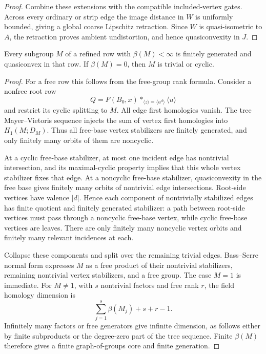 \begin{proof}
Combine these extensions with the compatible included-vertex
gates. Across every ordinary or strip edge the image distance
in \(W\) is uniformly bounded, giving a global coarse Lipschitz
retraction. Since \(W\) is quasi-isometric to \(A\), the retraction
proves ambient undistortion, and hence quasiconvexity in \(J\).
\end{proof}

\begin{lemma}\label{row:row-finiteness}
Every subgroup \(M\) of a refined row with \(\beta(M)<\infty\) is
finitely generated and quasiconvex in that row. If \(\beta(M)=0\),
then \(M\) is trivial or cyclic.
\end{lemma}

\begin{proof}
For a free row this follows from the free-group rank formula.
Consider a nonfree root row
\[
 Q=F(B_0,x)*_{\langle z\rangle=\langle u^d\rangle}\langle u\rangle
\]
and restrict its cyclic splitting to \(M\).
All edge first homologies vanish. The tree Mayer--Vietoris sequence
injects the sum of vertex first homologies into \(H_1(M;D_M)\).
Thus all free-base vertex stabilizers are finitely generated, and
only finitely many orbits of them are noncyclic.

At a cyclic free-base stabilizer, at most one incident edge has
nontrivial intersection, and its maximal-cyclic property implies
that this whole vertex stabilizer fixes that edge. At a noncyclic
free-base stabilizer, quasiconvexity in the free base gives finitely
many orbits of nontrivial edge intersections. Root-side vertices
have valence \(|d|\).
Hence each component of nontrivially stabilized edges has finite
quotient and finitely generated stabilizer: a path between root-side
vertices must pass through a noncyclic free-base vertex, while
cyclic free-base vertices are leaves. There are only finitely many
noncyclic vertex orbits and finitely many relevant incidences at each.

Collapse these components and split over the remaining trivial
edges. Bass--Serre normal form expresses \(M\) as a free product of
their nontrivial stabilizers, remaining nontrivial vertex stabilizers,
and a free group. The case \(M=1\) is immediate. For \(M\neq1\),
with \(s\) nontrivial factors and free rank \(r\), the field homology
dimension is
\[
 \sum_{j=1}^{s}\beta(M_j)+s+r-1.
\]
Infinitely many factors or free generators give infinite dimension,
as follows either by finite subproducts or the degree-zero part of
the tree sequence. Finite \(\beta(M)\) therefore gives a finite
graph-of-groups core and finite generation.


\end{proof}
